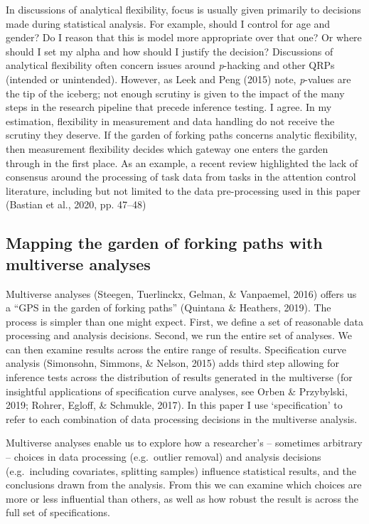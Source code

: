 \documentclass[
  english,
  man,floatsintext]{apa6}
\begin{document}
In discussions of analytical flexibility, focus is usually given primarily to decisions made during statistical analysis. For example, should I control for age and gender? Do I reason that this is model more appropriate over that one? Or where should I set my alpha and how should I justify the decision? Discussions of analytical flexibility often concern issues around \emph{p}-hacking and other QRPs (intended or unintended). However, as Leek and Peng (2015) note, \emph{p}-values are the tip of the iceberg; not enough scrutiny is given to the impact of the many steps in the research pipeline that precede inference testing. I agree. In my estimation, flexibility in measurement and data handling do not receive the scrutiny they deserve. If the garden of forking paths concerns analytic flexibility, then measurement flexibility decides which gateway one enters the garden through in the first place. As an example, a recent review highlighted the lack of consensus around the processing of task data from tasks in the attention control literature, including but not limited to the data pre-processing used in this paper (Bastian et al., 2020, pp. 47--48)

\hypertarget{mapping-the-garden-of-forking-paths-with-multiverse-analyses}{%
\subsection{Mapping the garden of forking paths with multiverse analyses}\label{mapping-the-garden-of-forking-paths-with-multiverse-analyses}}

Multiverse analyses (Steegen, Tuerlinckx, Gelman, \& Vanpaemel, 2016) offers us a ``GPS in the garden of forking paths'' (Quintana \& Heathers, 2019). The process is simpler than one might expect. First, we define a set of reasonable data processing and analysis decisions. Second, we run the entire set of analyses. We can then examine results across the entire range of results. Specification curve analysis (Simonsohn, Simmons, \& Nelson, 2015) adds third step allowing for inference tests across the distribution of results generated in the multiverse (for insightful applications of specification curve analyses, see Orben \& Przybylski, 2019; Rohrer, Egloff, \& Schmukle, 2017). In this paper I use `specification' to refer to each combination of data processing decisions in the multiverse analysis.

Multiverse analyses enable us to explore how a researcher's -- sometimes arbitrary -- choices in data processing (e.g.~outlier removal) and analysis decisions (e.g.~including covariates, splitting samples) influence statistical results, and the conclusions drawn from the analysis. From this we can examine which choices are more or less influential than others, as well as how robust the result is across the full set of specifications.
\end{document}
